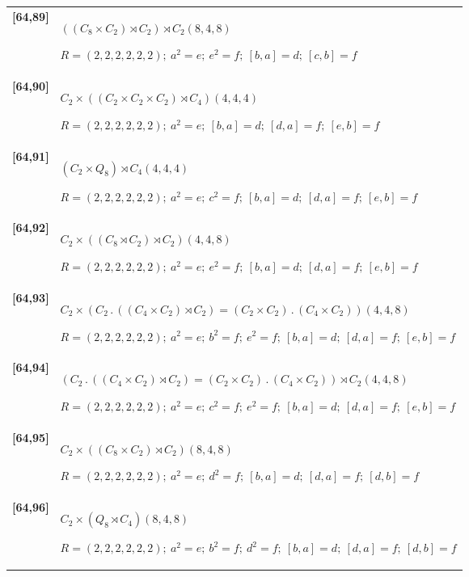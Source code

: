\documentclass[UTF8,fontset=fandol,11pt,a4paper]{ctexart}
\begin{document}
\begin{longtable}{@{}p{17mm}>{\raggedright\arraybackslash}p{141mm}@{}}
\textbf{[64,89]} & $((C_{8}\times C_{2})\rtimes C_{2})\rtimes C_{2}$\quad $(8,4,8)$\par\(R=(2,2,2,2,2,2);\allowbreak\ a^{2}=e;\allowbreak\ e^{2}=f;\allowbreak\ [b,a]=d;\allowbreak\ [c,b]=f\)\\[3pt]

\textbf{[64,90]} & $C_{2}\times ((C_{2}\times C_{2}\times C_{2})\rtimes C_{4})$\quad $(4,4,4)$\par\(R=(2,2,2,2,2,2);\allowbreak\ a^{2}=e;\allowbreak\ [b,a]=d;\allowbreak\ [d,a]=f;\allowbreak\ [e,b]=f\)\\[3pt]

\textbf{[64,91]} & $(C_{2}\times Q_{8})\rtimes C_{4}$\quad $(4,4,4)$\par\(R=(2,2,2,2,2,2);\allowbreak\ a^{2}=e;\allowbreak\ c^{2}=f;\allowbreak\ [b,a]=d;\allowbreak\ [d,a]=f;\allowbreak\ [e,b]=f\)\\[3pt]

\textbf{[64,92]} & $C_{2}\times ((C_{8}\rtimes C_{2})\rtimes C_{2})$\quad $(4,4,8)$\par\(R=(2,2,2,2,2,2);\allowbreak\ a^{2}=e;\allowbreak\ e^{2}=f;\allowbreak\ [b,a]=d;\allowbreak\ [d,a]=f;\allowbreak\ [e,b]=f\)\\[3pt]

\textbf{[64,93]} & $C_{2}\times (C_{2}\mathbin{.} ((C_{4}\times C_{2})\rtimes C_{2}) = (C_{2}\times C_{2})\mathbin{.} (C_{4}\times C_{2}))$\quad $(4,4,8)$\par\(R=(2,2,2,2,2,2);\allowbreak\ a^{2}=e;\allowbreak\ b^{2}=f;\allowbreak\ e^{2}=f;\allowbreak\ [b,a]=d;\allowbreak\ [d,a]=f;\allowbreak\ [e,b]=f\)\\[3pt]

\textbf{[64,94]} & $(C_{2}\mathbin{.} ((C_{4}\times C_{2})\rtimes C_{2}) = (C_{2}\times C_{2})\mathbin{.} (C_{4}\times C_{2}))\rtimes C_{2}$\quad $(4,4,8)$\par\(R=(2,2,2,2,2,2);\allowbreak\ a^{2}=e;\allowbreak\ c^{2}=f;\allowbreak\ e^{2}=f;\allowbreak\ [b,a]=d;\allowbreak\ [d,a]=f;\allowbreak\ [e,b]=f\)\\[3pt]

\textbf{[64,95]} & $C_{2}\times ((C_{8}\times C_{2})\rtimes C_{2})$\quad $(8,4,8)$\par\(R=(2,2,2,2,2,2);\allowbreak\ a^{2}=e;\allowbreak\ d^{2}=f;\allowbreak\ [b,a]=d;\allowbreak\ [d,a]=f;\allowbreak\ [d,b]=f\)\\[3pt]

\textbf{[64,96]} & $C_{2}\times (Q_{8}\rtimes C_{4})$\quad $(8,4,8)$\par\(R=(2,2,2,2,2,2);\allowbreak\ a^{2}=e;\allowbreak\ b^{2}=f;\allowbreak\ d^{2}=f;\allowbreak\ [b,a]=d;\allowbreak\ [d,a]=f;\allowbreak\ [d,b]=f\)\\[3pt]


\end{longtable}
\end{document}
